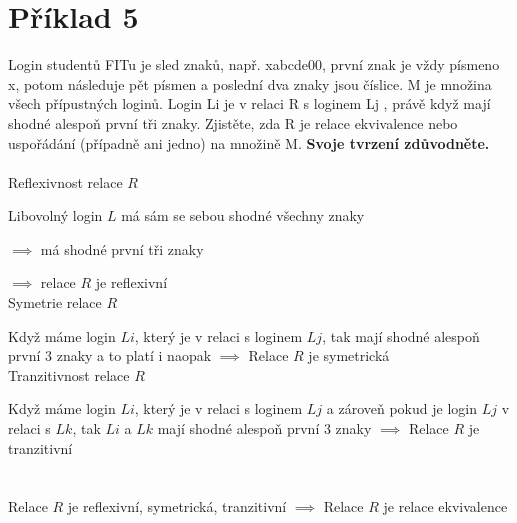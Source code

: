\section*{Příklad 5}
Login studentů FITu je sled znaků, např. xabcde00, první znak je vždy písmeno x, potom následuje
pět písmen a poslední dva znaky jsou číslice. M je množina všech přípustných loginů. Login Li je
v relaci R s loginem Lj , právě když mají shodné alespoň první tři znaky. Zjistěte, zda R je relace
ekvivalence nebo uspořádání (případně ani jedno) na množině M. \textbf{Svoje tvrzení zdůvodněte.}\\\\
Reflexivnost relace $R$

Libovolný login $L$ má sám se sebou shodné všechny znaky

$\implies$ má shodné první tři znaky

$\implies$ relace $R$ je reflexivní \\
Symetrie relace $R$

Když máme login $Li$, který je v relaci s loginem $Lj$, tak mají shodné alespoň první 3 znaky a to platí i naopak $\implies$ Relace $R$ je symetrická \\
Tranzitivnost relace $R$

Když máme login $Li$, který je v relaci s loginem $Lj$ a zároveň pokud je login $Lj$ v relaci s $Lk$, tak $Li$ a $Lk$ mají shodné alespoň první 3 znaky $\implies$ Relace $R$ je tranzitivní \\\\\\
Relace $R$ je reflexivní, symetrická, tranzitivní $\implies$ Relace $R$ je relace ekvivalence
